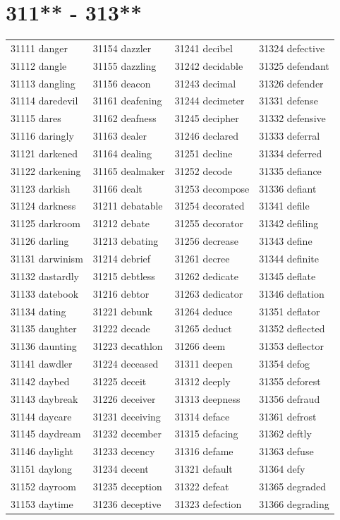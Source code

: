 \documentclass[10pt, oneside]{book}
\begin{document}
\begin{table}
	\centering
	\section*{311** - 313**}
	\begin{tabular}{l l l l}
31111 danger &31154 dazzler &31241 decibel &31324 defective\\
31112 dangle &31155 dazzling &31242 decidable &31325 defendant\\
31113 dangling &31156 deacon &31243 decimal &31326 defender\\
31114 daredevil &31161 deafening &31244 decimeter &31331 defense\\
31115 dares &31162 deafness &31245 decipher &31332 defensive\\
31116 daringly &31163 dealer &31246 declared &31333 deferral\\
31121 darkened &31164 dealing &31251 decline &31334 deferred\\
31122 darkening &31165 dealmaker &31252 decode &31335 defiance\\
31123 darkish &31166 dealt &31253 decompose &31336 defiant\\
31124 darkness &31211 debatable &31254 decorated &31341 defile\\
31125 darkroom &31212 debate &31255 decorator &31342 defiling\\
31126 darling &31213 debating &31256 decrease &31343 define\\
31131 darwinism &31214 debrief &31261 decree &31344 definite\\
31132 dastardly &31215 debtless &31262 dedicate &31345 deflate\\
31133 datebook &31216 debtor &31263 dedicator &31346 deflation\\
31134 dating &31221 debunk &31264 deduce &31351 deflator\\
31135 daughter &31222 decade &31265 deduct &31352 deflected\\
31136 daunting &31223 decathlon &31266 deem &31353 deflector\\
31141 dawdler &31224 deceased &31311 deepen &31354 defog\\
31142 daybed &31225 deceit &31312 deeply &31355 deforest\\
31143 daybreak &31226 deceiver &31313 deepness &31356 defraud\\
31144 daycare &31231 deceiving &31314 deface &31361 defrost\\
31145 daydream &31232 december &31315 defacing &31362 deftly\\
31146 daylight &31233 decency &31316 defame &31363 defuse\\
31151 daylong &31234 decent &31321 default &31364 defy\\
31152 dayroom &31235 deception &31322 defeat &31365 degraded\\
31153 daytime &31236 deceptive &31323 defection &31366 degrading\\
	\end{tabular}
 \end{table}
\clearpage
\end{document}
